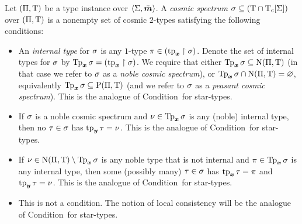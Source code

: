 \begin{definition}
Let $(\Pi,\mathrm{T})$ be a type instance over $\left\langle \mathrm{\Sigma},\bar{\bm{m}} \right\rangle$.
A \emph{cosmic spectrum} $\sigma \subseteq (\mathrm{T} \cap \mathrm{T}_{\mathrm{c}}[\mathrm{\Sigma}])$ over
$(\Pi,\mathrm{T})$ is a nonempty set of cosmic $2$-types satisfying the following
conditions:
\begin{itemize}
  \item[\condcspx]\label{cond:cspx}
  An \emph{internal type} for $\sigma$ is any $1$-type
  $\pi \in (\operatorname{tp}_{\bm{x}}\restriction\sigma)$. Denote the set of internal types for
  $\sigma$ by $\operatorname{Tp}_{\bm{x}}\sigma = (\operatorname{tp}_{\bm{x}}\restriction\sigma)$.
  We require that either $\operatorname{Tp}_{\bm{x}}\sigma \subseteq \mathrm{\mathrm{N}}(\Pi,\mathrm{T})$ (in that case we
  refer to $\sigma$ as a \emph{noble cosmic spectrum}), 
  or $\operatorname{Tp}_{\bm{x}}\sigma \cap \mathrm{\mathrm{N}}(\Pi,\mathrm{T}) = \varnothing$, equivalently $\operatorname{Tp}_{\bm{x}}\sigma
  \subseteq \mathrm{P}(\Pi,\mathrm{T})$ (and we refer to $\sigma$ as a \emph{peasant cosmic
  spectrum}).
  This is the analogue of Condition~ for star-types.
  \item[\condcspnx]\label{cond:cspnx}
  If $\sigma$ is a noble cosmic spectrum and $\nu \in \operatorname{Tp}_{\bm{x}}\sigma$ 
  is any (noble) internal type, then no $\tau \in \sigma$ has $\operatorname{tp}_{\bm{y}}\tau =
  \nu$.
  This is the analogue of Condition~ for star-types.
  \item[\condcspny]\label{cond:cspny}
  If $\nu \in \mathrm{\mathrm{N}}(\Pi,\mathrm{T}) \setminus \operatorname{Tp}_{\bm{x}}\sigma$ is any noble type
  that is not internal and $\pi \in \operatorname{Tp}_{\bm{x}}\sigma$ is any internal type, then
  some (possibly many) $\tau \in \sigma$ has $\operatorname{tp}_{\bm{x}}\tau = \pi$ and $\operatorname{tp}_{\bm{y}}\tau
  = \nu$.
  This is the analogue of Condition~ for star-types.
  \item[\condcspm]\label{cond:cspm}
  This is not a condition. The notion of local consistency
  will be the analogue of Condition~ for star-types.
\end{itemize}
\end{definition}

